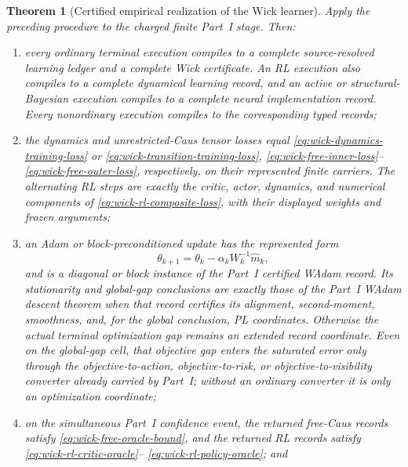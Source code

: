 \documentclass[11pt]{article}
\numberwithin{section}{part}
\theoremstyle{plain}
\newtheorem{theorem}{Theorem}[section]
\theoremstyle{definition}
\theoremstyle{remark}
\begin{document}
\begin{theorem}[Certified empirical realization of the Wick learner]
\label{thm:wick-certified-empirical-realization}
Apply the preceding procedure to the charged finite Part~I stage.  Then:
\begin{enumerate}[label=\textup{(\roman*)}]
\item every ordinary terminal execution compiles to a complete
      source-resolved learning ledger and a complete Wick certificate.  An
      RL execution also compiles to a complete dynamical learning record,
      and an active or structural-Bayesian execution compiles to a complete
      neural implementation record.  Every nonordinary execution compiles to
      the corresponding typed records;
\item the dynamics and unrestricted-Caus tensor losses equal
      \eqref{eq:wick-dynamics-training-loss} or
      \eqref{eq:wick-transition-training-loss},
      \eqref{eq:wick-free-inner-loss}--
      \eqref{eq:wick-free-outer-loss}, respectively, on their represented
      finite carriers.  The alternating RL steps are exactly the critic,
      actor, dynamics, and numerical components of
      \eqref{eq:wick-rl-composite-loss}, with their displayed weights and
      frozen arguments;
\item an Adam or block-preconditioned update has the represented form
      \begin{equation}
       \label{eq:wick-empirical-wadam-update}
       \theta_{k+1}
       =\theta_k-\alpha_kW_k^{-1}\widehat m_k,
      \end{equation}
      and is a diagonal or block instance of the Part~I certified WAdam
      record.  Its stationarity and global-gap conclusions are exactly those
      of the Part~I WAdam descent theorem when that record certifies its
      alignment, second-moment, smoothness, and, for the global conclusion,
      PL coordinates.  Otherwise the actual terminal optimization gap
      remains an extended record coordinate.  Even on the global-gap cell,
      that objective gap enters the saturated error only through the
      objective-to-action, objective-to-risk, or objective-to-visibility
      converter already carried by Part~I; without an ordinary converter it
      is only an optimization coordinate;
\item on the simultaneous Part~I confidence event, the returned free-Caus
      records satisfy \eqref{eq:wick-free-oracle-bound}, and the returned RL
      records satisfy \eqref{eq:wick-rl-critic-oracle}--
      \eqref{eq:wick-rl-policy-oracle}; and

\end{enumerate}
\end{theorem}
\end{document}

